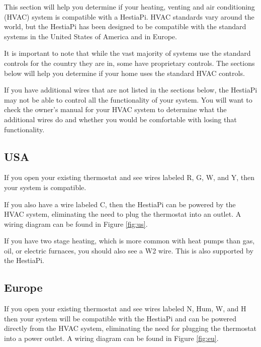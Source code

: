 This section will help you determine if your heating, venting and air
conditioning (HVAC) system is compatible with a HestiaPi. HVAC standards vary
around the world, but the HestiaPi has been designed to be compatible with the
standard systems in the United States of America and in Europe.

It is important to note that while the vast majority of systems use the
standard controls for the country they are in, some have proprietary
controls. The sections below will help you determine if your home uses the
standard HVAC controls.

If you have additional wires that are not listed in the sections below, the
HestiaPi may not be able to control all the functionality of your system. You
will want to check the owner's manual for your HVAC system to determine what
the additional wires do and whether you would be comfortable with losing that
functionality.

\subsection{USA}
If you open your existing thermostat and see wires labeled R, G, W, and Y, then
your system is compatible.

If you also have a wire labeled C, then the HestiaPi can be powered by the HVAC
system, eliminating the need to plug the thermostat into an outlet. A wiring
diagram can be found in Figure \ref{fig:us}.

If you have two stage heating, which is more common with heat pumps than gas,
oil, or electric furnaces, you should also see a W2 wire. This is also
supported by the HestiaPi.

\subsection{Europe}
If you open your existing thermostat and see wires labeled N, Hum, W, and H then
your system will be compatible with the HestiaPi and can be powered directly
from the HVAC system, eliminating the need for plugging the thermostat into a
power outlet.  A wiring diagram can be found in Figure \ref{fig:eu}.
